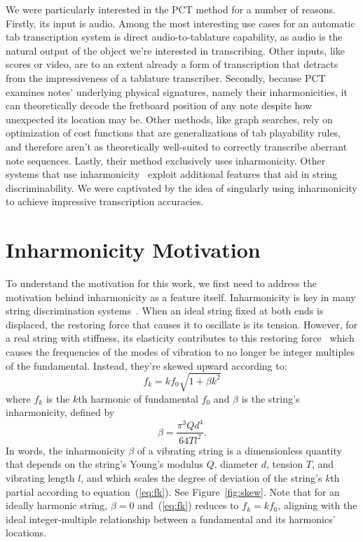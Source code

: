 \documentclass[12pt]{cmuthesis}
\begin{document}
We were particularly interested in the PCT method for a number of reasons. Firstly, its input is audio. Among the most interesting use cases for an automatic tab transcription system is direct audio-to-tablature capability, as audio is the natural output of the object we're interested in transcribing. Other inputs, like scores or video, are to an extent already a form of transcription that detracts from the impressiveness of a tablature transcriber. Secondly, because PCT examines notes' underlying physical signatures, namely their inharmonicities, it can theoretically decode the fretboard position of any note despite how unexpected its location may be. Other methods, like graph searches, rely on optimization of cost functions that are generalizations of tab playability rules, and therefore aren't as theoretically well-suited to correctly transcribe aberrant note sequences. Lastly, their method exclusively uses inharmonicity. Other systems that use inharmonicity~\cite{barbancho2009,abesser2012,dittmar2013,kehling2014} exploit additional features that aid in string discriminability. We were captivated by the idea of singularly using inharmonicity to achieve impressive transcription accuracies.

\section{Inharmonicity Motivation}
To understand the motivation for this work, we first need to address the motivation behind inharmonicity as a feature itself. Inharmonicity is key in many string discrimination systems~\cite{barbancho2009,barbanchoi2012,abesser2012,dittmar2013,kehling2014}. When an ideal string fixed at both ends is displaced, the restoring force that causes it to oscillate is its tension. However, for a real string with stiffness, its elasticity contributes to this restoring force~\cite{fletcher1962} which causes the frequencies of the modes of vibration to no longer be integer multiples of the fundamental. Instead, they're skewed upward according to: 
\begin{equation}
\label{eq:fk}
f_k = kf_{0}\sqrt{1+\beta k^2}
\end{equation}
where $f_k$ is the $k$th harmonic of fundamental $f_0$ and $\beta$ is the string's inharmonicity, defined by
\begin{equation}
\beta = \frac{\pi^3 Q d^4}{64 T l^2}. \label{eq:beta}
\end{equation}
In words, the inharmonicity $\beta$ of a vibrating string is a dimensionless quantity that depends on the string's Young's modulus $Q$, diameter $d$, tension $T$, and vibrating length $l$, and which scales the degree of deviation of the string's $k$th partial according to equation~(\ref{eq:fk}). See Figure~\ref{fig:skew}. Note that for an ideally harmonic string, $\beta = 0$ and~(\ref{eq:fk}) reduces to $f_k = kf_0$, aligning with the ideal integer-multiple relationship between a fundamental and its harmonics' locations.
\end{document}
